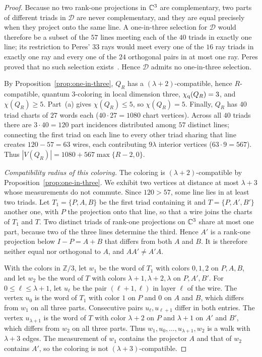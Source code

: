 \begin{proof}
Because no two rank-one projections in $\mathbb C^3$ are complementary, two parts of different triads in $\mathcal D$ are never complementary, and they are equal precisely when they project onto the same line. A one-in-three selection for $\mathcal D$ would therefore be a subset of the $57$ lines meeting each of the $40$ triads in exactly one line; its restriction to Peres' $33$ rays would meet every one of the $16$ ray triads in exactly one ray and every one of the $24$ orthogonal pairs in at most one ray. Peres proved that no such selection exists~\cite{Peres91}. Hence $\mathcal D$ admits no one-in-three selection.

By Proposition~\ref{prop:one-in-three}, $Q_R$ has a $(\lambda+2)$-compatible, hence $R$-compatible, quantum $3$-coloring in local dimension three, $\chi_{\mathrm q}(Q_R)=3$, and $\chi(Q_R)\ge5$. Part~(a) gives $\chi(Q_R)\le5$, so $\chi(Q_R)=5$. Finally, $Q_R$ has $40$ triad charts of $27$ words each ($40\cdot27=1080$ chart vertices). Across all $40$ triads there are $3\cdot40=120$ part incidences distributed among $57$ distinct lines; connecting the first triad on each line to every other triad sharing that line creates $120-57=63$ wires, each contributing $9\lambda$ interior vertices ($63\cdot9=567$). Thus $|V(Q_R)|=1080+567\max\{R-2,0\}$.

\emph{Compatibility radius of this coloring.} The coloring is $(\lambda+2)$-compatible by Proposition~\ref{prop:one-in-three}. We exhibit two vertices at distance at most $\lambda+3$ whose measurements do not commute. Since $120>57$, some line lies in at least two triads. Let $T_1=\{P,A,B\}$ be the first triad containing it and $T=\{P,A',B'\}$ another one, with $P$ the projection onto that line, so that a wire joins the charts of $T_1$ and $T$. Two distinct triads of rank-one projections on $\mathbb C^3$ share at most one part, because two of the three lines determine the third. Hence $A'$ is a rank-one projection below $I-P=A+B$ that differs from both $A$ and $B$. It is therefore neither equal nor orthogonal to $A$, and $AA'\ne A'A$.

With the colors in $\mathbb Z/3$, let $w_1$ be the word of $T_1$ with colors $0,1,2$ on $P,A,B$, and let $w_2$ be the word of $T$ with colors $\lambda+1,\lambda+2,\lambda$ on $P,A',B'$. For $0\le\ell\le\lambda+1$, let $u_\ell$ be the pair $(\ell+1,\ell)$ in layer $\ell$ of the wire. The vertex $u_0$ is the word of $T_1$ with color $1$ on $P$ and $0$ on $A$ and $B$, which differs from $w_1$ on all three parts. Consecutive pairs $u_\ell,u_{\ell+1}$ differ in both entries. The vertex $u_{\lambda+1}$ is the word of $T$ with color $\lambda+2$ on $P$ and $\lambda+1$ on $A'$ and $B'$, which differs from $w_2$ on all three parts. Thus $w_1,u_0,\ldots,u_{\lambda+1},w_2$ is a walk with $\lambda+3$ edges. The measurement of $w_1$ contains the projector $A$ and that of $w_2$ contains $A'$, so the coloring is not $(\lambda+3)$-compatible.


\end{proof}
